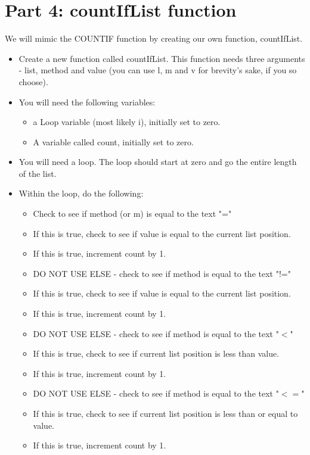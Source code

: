 \documentclass{article}
\begin{document}
\section*{Part 4: countIfList function}
We will mimic the COUNTIF function by creating our own function, countIfList.
\begin{itemize}
    \item Create a new function called countIfList.  This function needs three arguments - list, method and value (you can use l, m and v for brevity's sake, if you so choose).
    \item You will need the following variables:
    \begin{itemize}
    		\item a Loop variable (most likely i), initially set to zero.
    		\item A variable called count, initially set to zero.
    	\end{itemize}
    	\item You will need a loop.  The loop should start at zero and go the entire length of the list.
    	\item Within the loop, do the following:
    	\begin{itemize}
    		\item Check to see if method (or m) is equal to the text "="
    		\item If this is true, check to see if value is equal to the current list position.
    		\item If this is true, increment count by 1.
    		\item DO NOT USE ELSE - check to see if method is equal to the text "!="
    		\item If this is true, check to see if value is equal to the current list position.
    		\item If this is true, increment count by 1.
    		\item DO NOT USE ELSE - check to see if method is equal to the text "$<$"
    		\item If this is true, check to see if current list position is less than value.
    		\item If this is true, increment count by 1.
    		\item DO NOT USE ELSE - check to see if method is equal to the text "$<=$"
    		\item If this is true, check to see if current list position is less than or equal to value.
    		\item If this is true, increment count by 1.

\end{itemize}
\end{itemize}
\end{document}
